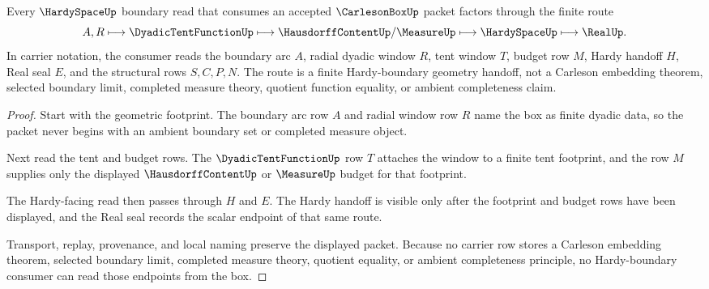 \begin{theorem}
\label{thm:carleson-box-hardy-boundary-route}
Every $\HardySpaceUp$ boundary read that consumes an accepted $\CarlesonBoxUp$ packet factors through the finite route
$$
A,R \longmapsto \DyadicTentFunctionUp \longmapsto \HausdorffContentUp/\MeasureUp \longmapsto \HardySpaceUp \longmapsto \RealUp .
$$
In carrier notation, the consumer reads the boundary arc $A$, radial dyadic window $R$, tent window $T$, budget row $M$, Hardy handoff $H$, Real seal $E$, and the structural rows $S,C,P,N$. The route is a finite Hardy-boundary geometry handoff, not a Carleson embedding theorem, selected boundary limit, completed measure theory, quotient function equality, or ambient completeness claim.
\end{theorem}
\begin{proof}
Start with the geometric footprint. The boundary arc row $A$ and radial window row $R$ name the box as finite dyadic data, so the packet never begins with an ambient boundary set or completed measure object.

Next read the tent and budget rows. The $\DyadicTentFunctionUp$ row $T$ attaches the window to a finite tent footprint, and the row $M$ supplies only the displayed $\HausdorffContentUp$ or $\MeasureUp$ budget for that footprint.

The Hardy-facing read then passes through $H$ and $E$. The Hardy handoff is visible only after the footprint and budget rows have been displayed, and the Real seal records the scalar endpoint of that same route.

Transport, replay, provenance, and local naming preserve the displayed packet. Because no carrier row stores a Carleson embedding theorem, selected boundary limit, completed measure theory, quotient equality, or ambient completeness principle, no Hardy-boundary consumer can read those endpoints from the box.
\end{proof}



